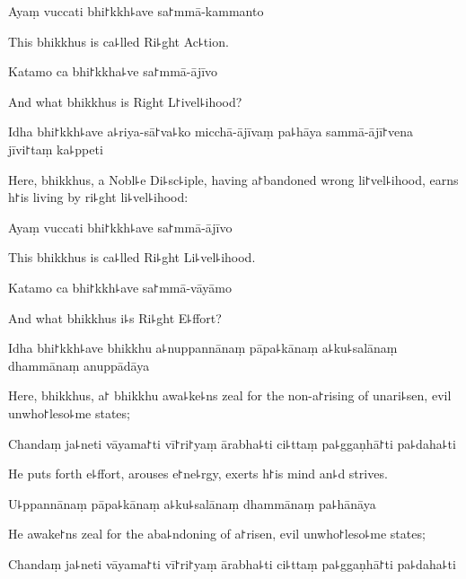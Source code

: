 Ayaṃ vuccati bhi꜓kkh꜕ave sa꜓mmā-kammanto

\begin{english}
  This bhikkhus is ca꜕lled Ri꜕ght Ac꜕tion.
\end{english}

Katamo ca bhi꜓kkha꜕ve sa꜓mmā-ājīvo

\begin{english}
  And what bhikkhus is Right L꜓ivel꜕ihood?
\end{english}

Idha bhi꜓kkh꜕ave a꜕riya-sā꜓va꜕ko micchā-ājīvaṃ pa꜕hāya sammā-ājī꜓vena jīvi꜓taṃ ka꜕ppeti

\begin{english}
  Here, bhikkhus, a Nobl꜕e Di꜕sc꜕iple, having a꜓bandoned wrong li꜓vel꜕ihood, earns h꜓is living by ri꜕ght li꜕vel꜕ihood:
\end{english}

Ayaṃ vuccati bhi꜓kkh꜕ave sa꜓mmā-ājīvo

\begin{english}
  This bhikkhus is ca꜕lled Ri꜕ght Li꜕vel꜕ihood.
\end{english}

Katamo ca bhi꜓kkh꜕ave sa꜓mmā-vāyāmo

\begin{english}
  And what bhikkhus i꜕s Ri꜕ght E꜕ffort?
\end{english}

Idha bhi꜓kkh꜕ave bhikkhu a꜕nuppannānaṃ pāpa꜕kānaṃ a꜕ku꜕salānaṃ dhammānaṃ anuppādāya

\begin{english}
  Here, bhikkhus, a꜓ bhikkhu awa꜕ke꜕ns zeal for the non-a꜓rising of unari꜕sen, evil unwho꜓leso꜕me states;
\end{english}

Chandaṃ ja꜕neti vāyama꜓ti vī꜓ri꜓yaṃ ārabha꜕ti ci꜕ttaṃ pa꜕ggaṇhā꜓ti pa꜕daha꜕ti

\begin{english}
  He puts forth e꜕ffort, arouses e꜓ne꜕rgy, exerts h꜓is mind an꜕d strives.
\end{english}

U꜕ppannānaṃ pāpa꜕kānaṃ a꜕ku꜕salānaṃ dhammānaṃ pa꜕hānāya

\begin{english}
  He awake꜓ns zeal for the aba꜕ndoning of a꜓risen, evil unwho꜓leso꜕me states;
\end{english}

Chandaṃ ja꜕neti vāyama꜓ti vī꜓ri꜓yaṃ ārabha꜕ti ci꜕ttaṃ pa꜕ggaṇhā꜓ti pa꜕daha꜕ti

